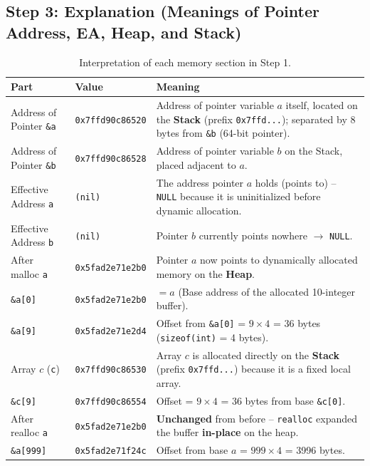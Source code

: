\documentclass[12pt,a4paper]{article}
\begin{document}
\clearpage
\subsection{Step 3: Explanation (Meanings of Pointer Address, EA, Heap, and Stack)}

\begin{table}[ht!]
\centering
\small
\begin{tabular}{@{}p{3.5cm}p{3.2cm}p{8.5cm}@{}}
\toprule
\textbf{Part} & \textbf{Value} & \textbf{Meaning} \\
\midrule
Address of Pointer \verb|&a| & \verb|0x7ffd90c86520| & Address of pointer variable $a$ itself, located on the \textbf{Stack} (prefix \texttt{0x7ffd...}); separated by 8 bytes from \verb|&b| (64-bit pointer). \\
Address of Pointer \verb|&b| & \verb|0x7ffd90c86528| & Address of pointer variable $b$ on the Stack, placed adjacent to $a$. \\
Effective Address \verb|a| & \verb|(nil)| & The address pointer $a$ holds (points to) -- \texttt{NULL} because it is uninitialized before dynamic allocation. \\
Effective Address \verb|b| & \verb|(nil)| & Pointer $b$ currently points nowhere $\to$ \texttt{NULL}. \\
After malloc \verb|a| & \verb|0x5fad2e71e2b0| & Pointer $a$ now points to dynamically allocated memory on the \textbf{Heap}. \\
\verb|&a[0]| & \verb|0x5fad2e71e2b0| & $= a$ (Base address of the allocated 10-integer buffer). \\
\verb|&a[9]| & \verb|0x5fad2e71e2d4| & Offset from \verb|&a[0]| = $9 \times 4$ = 36 bytes (\texttt{sizeof(int)} = 4 bytes). \\
Array $c$ (\verb|c|) & \verb|0x7ffd90c86530| & Array $c$ is allocated directly on the \textbf{Stack} (prefix \texttt{0x7ffd...}) because it is a fixed local array. \\
\verb|&c[9]| & \verb|0x7ffd90c86554| & Offset = $9 \times 4$ = 36 bytes from base \texttt{\&c[0]}. \\
After realloc \verb|a| & \verb|0x5fad2e71e2b0| & \textbf{Unchanged} from before -- \texttt{realloc} expanded the buffer \textbf{in-place} on the heap. \\
\verb|&a[999]| & \verb|0x5fad2e71f24c| & Offset from base $a$ = $999 \times 4$ = 3996 bytes. \\
\bottomrule
\end{tabular}
\caption{Interpretation of each memory section in Step 1.}
\end{table}
\end{document}
